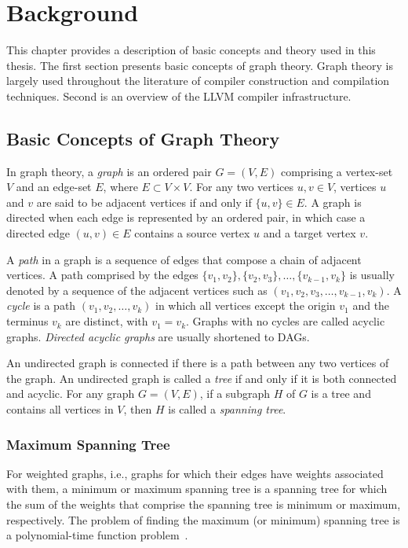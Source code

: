 \chapter{Background}

This chapter provides a description of basic concepts and theory used in this thesis.
The first section presents basic concepts of graph theory.
Graph theory is largely used throughout the literature of compiler construction and compilation techniques.
Second is an overview of the LLVM compiler infrastructure.

\section{Basic Concepts of Graph Theory}

In graph theory, a \textit{graph} is an ordered pair $G = (V,E)$ comprising a vertex-set $V$ and an edge-set $E$, where $E \subset V\times V$.
For any two vertices $u,v\in V$, vertices $u$ and $v$ are said to be adjacent vertices if and only if $\{u,v\}\in E$.
A graph is directed when each edge is represented by an ordered pair, in which case a directed edge $(u,v)\in E$ contains a source vertex $u$ and a target vertex $v$.

A \textit{path} in a graph is a sequence of edges that compose a chain of adjacent vertices.
A path comprised by the edges $\{v_1,v_2\}, \{v_2,v_3\}, \ldots, \{v_{k-1},v_k\}$ is usually denoted by a sequence of the adjacent vertices such as $(v_1,v_2,v_3,\ldots,v_{k-1},v_k)$.
A \textit{cycle} is a path $(v_1,v_2,\ldots,v_k)$ in which all vertices except the origin $v_1$ and the terminus $v_k$ are distinct, with $v_1=v_k$.
Graphs with no cycles are called acyclic graphs.
\textit{Directed acyclic graphs} are usually shortened to DAGs.

An undirected graph is connected if there is a path between any two vertices of the graph.
An undirected graph is called a \textit{tree} if and only if it is both connected and acyclic.
For any graph $G = (V,E)$, if a subgraph $H$ of $G$ is a tree and contains all vertices in $V$, then $H$ is called a \textit{spanning tree}.

\subsection{Maximum Spanning Tree}

For weighted graphs, i.e., graphs for which their edges have weights associated with them, a minimum or maximum spanning tree is a spanning tree for which
the sum of the weights that comprise the spanning tree is minimum or maximum, respectively.
The problem of finding the maximum (or minimum) spanning tree is a polynomial-time function problem~\citep{kruskal56,bazlamacci01}.


